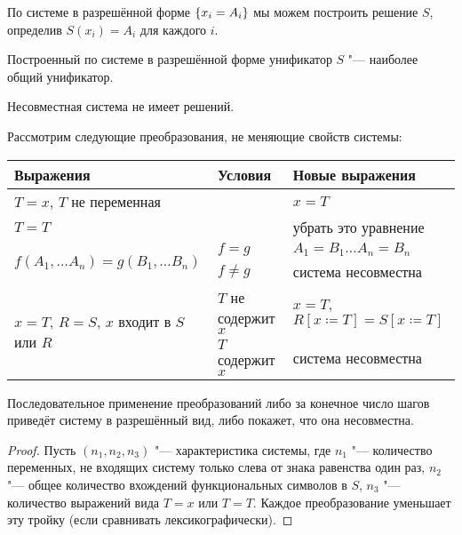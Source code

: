 По системе в разрешённой форме $\left\{x_i = A_i\right\}$ мы можем построить решение $S$, определив $S(x_i) = A_i$ для каждого $i$.

\begin{statement}
    Построенный по системе в разрешённой форме унификатор $S$ "--- наиболее общий унификатор.
\end{statement}

\begin{statement}
    Несовместная система не имеет решений.
\end{statement}

Рассмотрим следующие преобразования, не меняющие свойств системы:
\begin{center}
\begin{tabular}{l l l} \toprule
    Выражения                         & Условия             & Новые выражения \\ \midrule
    $T=x$, $T$ не переменная          &                     & $x=T$ \\ \midrule
    $T=T$                             &                     & убрать это уравнение \\ \midrule
    \multirow{2}{*}[-\aboverulesep]{$f(A_1, \ldots A_n) = g(B_1, \ldots B_n)$}
                                      & $f=g$               & $ A_1 = B_1 \ldots A_n = B_n$ \\ \cmidrule{2-3}
                                      & $f \neq g$          & система несовместна \\ \midrule
    \multirow{2}{*}[-\aboverulesep]{$x=T$, $R=S$, $x$ входит в $S$ или $R$}
                                      & $T$ не содержит $x$ & $x=T$,
                                        $R\left[x\coloneqq T\right]=S\left[x\coloneqq T\right]$\\ \cmidrule{2-3}
                                      & $T$ содержит $x$    & система несовместна \\ \bottomrule
\end{tabular}
\end{center}

\begin{statement}
    Последовательное применение преобразований либо за конечное число шагов приведёт систему в разрешённый вид,
    либо покажет, что она несовместна.
\end{statement}

\begin{proof}
    Пусть $(n_1, n_2, n_3)$ "--- характеристика системы, где
    $n_1$ "--- количество переменных, не входящих систему только слева от знака равенства один раз,
    $n_2$ "--- общее количество вхождений функциональных символов в $S$,
    $n_3$ "--- количество выражений вида $T=x$ или $T=T$.
    Каждое преобразование уменьшает эту тройку (если сравнивать лексикографически).
\end{proof}

